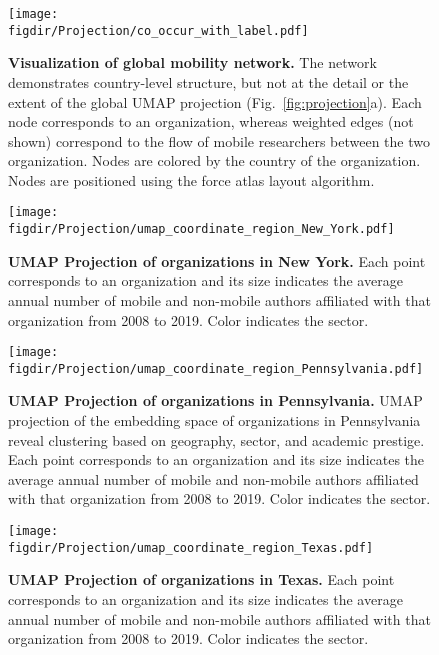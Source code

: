 \documentclass[12pt]{article} %
\def\figdir{../Figs}
\begin{document}
%
%
\begin{figure}[hp!]
	\centering
	\texttt{[image: \\figdir/Projection/co\_occur\_with\_label.pdf]}
	\caption{
		\textbf{Visualization of global mobility network.}
		The network demonstrates country-level structure, but not at the detail or the extent of the global UMAP projection (Fig.~\ref{fig:projection}a).
		Each node corresponds to an organization, whereas  weighted edges (not shown) correspond to the flow of mobile researchers between the two organization.
		Nodes are colored by the country of the organization.
		Nodes are positioned using the force atlas layout algorithm.
	}
	\label{fig:supp:network_vis}
\end{figure}



%
%
\begin{figure}[hp!]
	\centering
	\texttt{[image: \\figdir/Projection/umap\_coordinate\_region\_New\_York.pdf]}
	\caption{
		\textbf{UMAP Projection of organizations in New York.}
		Each point corresponds to an organization and its size indicates the average annual number of mobile and non-mobile authors affiliated with that organization from 2008 to 2019.
		Color indicates the sector.
	}
	\label{fig:supp:proj_newyork}
\end{figure}


%
%
\begin{figure}[hp!]
	\centering
	\texttt{[image: \\figdir/Projection/umap\_coordinate\_region\_Pennsylvania.pdf]}
	\caption{
		\textbf{UMAP Projection of organizations in Pennsylvania.}
		UMAP projection of the embedding space of organizations in Pennsylvania reveal clustering based on geography, sector, and academic prestige.
		Each point corresponds to an organization and its size indicates the average annual number of mobile and non-mobile authors affiliated with that organization from 2008 to 2019.
		Color indicates the sector.
	}
	\label{fig:supp:proj_pennsylvania}
\end{figure}


%
%
\begin{figure}[hp!]
	\centering
	\texttt{[image: \\figdir/Projection/umap\_coordinate\_region\_Texas.pdf]}
	\caption{
		\textbf{UMAP Projection of organizations in Texas.}
		Each point corresponds to an organization and its size indicates the average annual number of mobile and non-mobile authors affiliated with that organization from 2008 to 2019.
		Color indicates the sector.
	}
	\label{fig:supp:proj_texas}
\end{figure}
\end{document}
